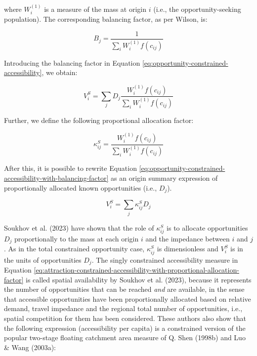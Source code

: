 \documentclass[
11pt, %
oneside, %
english, %
singlespacing, %
]{macthesis} %
\begin{document}
\noindent where \(W_i^{(1)}\) is a measure of the mass at origin \(i\) (i.e., the opportunity-seeking population). The corresponding balancing factor, as per Wilson, is:

\begin{equation}
\label{eq:opportunity-constrained-proportionality-constants}
B_j = \frac{1}{\sum_i W_i^{(1)} f(c_{ij})}
\end{equation} 

Introducing the balancing factor in Equation \ref{eq:opportunity-constrained-accessibility}, we obtain:

\begin{equation}
\label{eq:opportunity-constrained-accessibility-with-balancing-factor}
V^S_{i} = \sum_j D_j \frac{W_i^{(1)} f(c_{ij})}{\sum_i W_i^{(1)} f(c_{ij})}
\end{equation} 

Further, we define the following proportional allocation factor:

\begin{equation}
\label{eq:opportunity-constrained-proportional-allocation-factor}
\kappa^S_{ij} = \frac{W_i^{(1)} f(c_{ij})}{\sum_i W_i^{(1)} f(c_{ij})}
\end{equation} 

After this, it is possible to rewrite Equation \ref{eq:opportunity-constrained-accessibility-with-balancing-factor} as an origin summary expression of proportionally allocated known opportunities (i.e., \(D_j\)).

\begin{equation}
\label{eq:attraction-constrained-accessibility-with-proportional-allocation-factor}
V^S_{i} = \sum_j \kappa^S_{ij} D_j
\end{equation} 

Soukhov et al. (2023) have shown that the role of \(\kappa^S_{ij}\) is to allocate opportunities \(D_j\) proportionally to the mass at each origin \(i\) and the impedance between \(i\) and \(j\). As in the total constrained opportunity case, \(\kappa^S_{ij}\) is dimensionless and \(V_i^S\) is in the units of opportunities \(D_j\). The singly constrained accessibility measure in Equation \ref{eq:attraction-constrained-accessibility-with-proportional-allocation-factor} is called spatial availability by Soukhov et al. (2023), because it represents the number of opportunities that can be reached \emph{and} are available, in the sense that accessible opportunities have been proportionally allocated based on relative demand, travel impedance and the regional total number of opportunities, i.e., spatial competition for them has been considered. These authors also show that the following expression (accessibility per capita) is a constrained version of the popular two-stage floating catchment area measure of Q. Shen (1998b) and Luo \& Wang (2003a):
\end{document}
